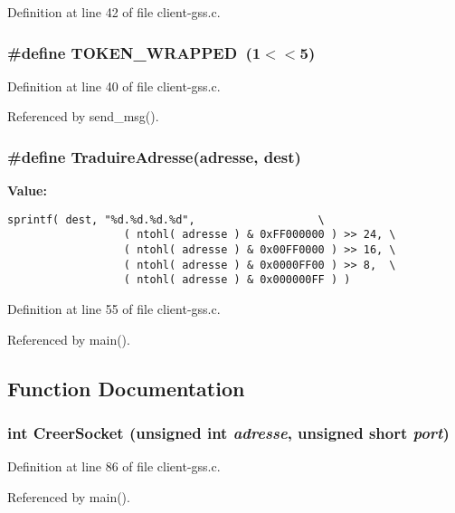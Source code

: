 Definition at line 42 of file client-gss.c.
\subsubsection{\setlength{\rightskip}{0pt plus 5cm}\#define TOKEN\_\-WRAPPED\ (1$<$$<$5)}\label{client-gss_8c_a5}




Definition at line 40 of file client-gss.c.

Referenced by send\_\-msg().
\subsubsection{\setlength{\rightskip}{0pt plus 5cm}\#define Traduire\-Adresse(adresse, dest)}\label{client-gss_8c_a10}


{\bf Value:}

\footnotesize\begin{verbatim}sprintf( dest, "%d.%d.%d.%d",                   \
                  ( ntohl( adresse ) & 0xFF000000 ) >> 24, \
                  ( ntohl( adresse ) & 0x00FF0000 ) >> 16, \
                  ( ntohl( adresse ) & 0x0000FF00 ) >> 8,  \
                  ( ntohl( adresse ) & 0x000000FF ) )
\end{verbatim}\normalsize 


Definition at line 55 of file client-gss.c.

Referenced by main().

\subsection{Function Documentation}
\subsubsection{\setlength{\rightskip}{0pt plus 5cm}int Creer\-Socket (unsigned int {\em adresse}, unsigned short {\em port})}\label{client-gss_8c_a23}




Definition at line 86 of file client-gss.c.

Referenced by main().
